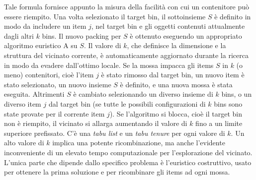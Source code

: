 \documentclass[12pt,a4paper,openright,twoside]{report}
\begin{document}
Tale formula fornisce appunto la misura della facilit\`{a} con cui un contenitore pu\`{o} essere riempito. Una volta selezionato il target bin, il sottoinsieme $S$ \`{e} definito in modo da includere un item $j$, nel target bin e gli oggetti contenuti attualmente dagli altri $k$ bins. Il nuovo packing per $S$ \`{e} ottenuto eseguendo un appropriato algoritmo euristico A su $S$. Il valore di $k$, che definisce la dimensione e la struttura del vicinato corrente, \`{e} automaticamente aggiornato durante la ricerca in modo da evadere dall'ottimo locale. Se la mossa impacca gli items $S$ in $k$ (o meno) contenitori, cio\`{e} l'item $j$ \`{e} stato rimosso dal target bin, un nuovo item \`{e} stato selezionato, un nuovo insieme $S$ \`{e} definito, e una nuova mossa \`{e} stata eseguita. Altrimenti $S$ \`{e} cambiato selezionando un diverso insieme di $k$ bins, o un diverso item $j$ dal target bin (se tutte le possibili configurazioni di $k$ bins sono state provate per il corrente item $j$). Se l'algoritmo si blocca, cio\`{e} il target bin non \`{e} riempito, il vicinato si allarga aumentando il valore di $k$ fino a un limite superiore prefissato. C'\`{e} una \textit{tabu list} e un \textit{tabu tenure} per ogni valore di $k$. Un alto valore di $k$ implica una potente ricombinazione, ma anche l'evidente inconveniente di un elevato tempo computazionale per l'esplorazione del vicinato. L'unica parte che dipende dallo specifico problema \`{e} l'euristico costruttivo, usato per ottenere la prima soluzione e per ricombinare gli items ad ogni mossa.
\end{document}
